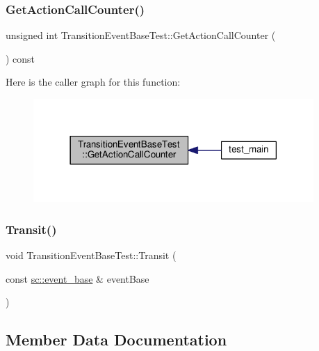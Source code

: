 \subsubsection{\texorpdfstring{Get\+Action\+Call\+Counter()}{GetActionCallCounter()}}
{\footnotesize\ttfamily unsigned int Transition\+Event\+Base\+Test\+::\+Get\+Action\+Call\+Counter (\begin{DoxyParamCaption}{ }\end{DoxyParamCaption}) const\hspace{0.3cm}{\ttfamily [inline]}}

Here is the caller graph for this function\+:
\nopagebreak
\begin{figure}[H]
\begin{center}
\leavevmode
\includegraphics[width=302pt]{struct_transition_event_base_test_aaa7342cb01aaa149b772ca279fdb4473_icgraph}
\end{center}
\end{figure}
\mbox{\label{struct_transition_event_base_test_a51e7226f3256cceaf604f958287bcd8b}} 
\subsubsection{\texorpdfstring{Transit()}{Transit()}}
{\footnotesize\ttfamily void Transition\+Event\+Base\+Test\+::\+Transit (\begin{DoxyParamCaption}\item[{const \mbox{\hyperlink{classboost_1_1statechart_1_1event__base}{sc\+::event\+\_\+base}} \&}]{event\+Base }\end{DoxyParamCaption})\hspace{0.3cm}{\ttfamily [inline]}}



\subsection{Member Data Documentation}
\mbox{\label{struct_transition_event_base_test_aad873f2ba169a021f6086a584b9542c3}} 
